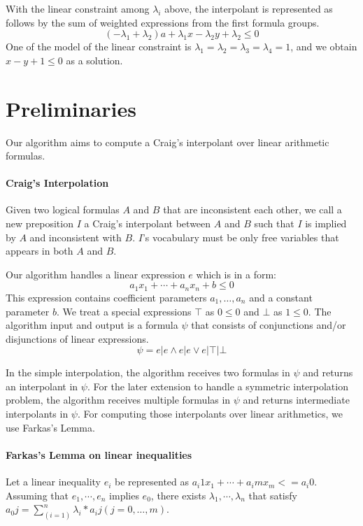 \documentclass[master,final,12pt]{iscs-thesis}
\begin{document}
With the linear constraint among $\lambda_i$ above, the interpolant is
represented as follows by the sum of weighted expressions from the
first formula groups.
\[ (- \lambda_1 + \lambda_2) a + \lambda_1 x - \lambda_2 y + \lambda_2 \leq 0 \]
One of the model of the linear constraint is $\lambda_1 = \lambda_2 =
\lambda_3 = \lambda_4 = 1$, and we obtain $x-y+1 \leq 0$ as a
solution.



\section{Preliminaries}

Our algorithm aims to compute a Craig's interpolant over linear
arithmetic formulas.


\paragraph{Craig's Interpolation}
Given two logical formulas $A$ and $B$ that are inconsistent each
other, we call a new preposition $I$ a Craig's interpolant between $A$
and $B$ such that $I$ is implied by $A$ and inconsistent with $B$.
$I$'s vocabulary must be only free variables that appears in both $A$
and $B$.

Our algorithm handles a linear expression $e$ which is in a form:
\[ a_1 x_1 + \cdots + a_n x_n + b \leq 0 \]
This expression contains coefficient parameters $a_1, \ldots, a_n$ and
a constant parameter $b$.  We treat a special expressions $\top$ as $0
\leq 0$ and $\bot$ as $1 \leq 0$.  The algorithm input and output is a
formula $\psi$ that consists of conjunctions and/or disjunctions of
linear expressions.
\[ \psi = e | e \wedge e | e \vee e | \top | \bot \]

In the simple interpolation, the algorithm receives two formulas in
$\psi$ and returns an interpolant in $\psi$.  For the later extension
to handle a symmetric interpolation problem, the algorithm receives
multiple formulas in $\psi$ and returns intermediate interpolants in
$\psi$.  For computing those interpolants over linear arithmetics, we
use Farkas's Lemma.


\paragraph{Farkas's Lemma on linear inequalities}
Let a linear inequality $e_i$ be represented as $a_i1 x_1 + \cdots +
a_im x_m <= a_i0$.  Assuming that $e_1,\cdots,e_n$ implies $e_0$,
there exists $\lambda_1,\cdots,\lambda_n$ that satisfy $a_0j
=\sum_(i=1)^n \lambda_i * a_ij (j=0, \ldots, m)$.
\end{document}
